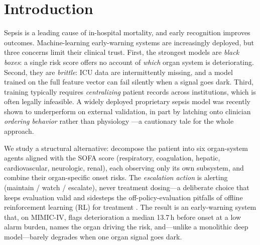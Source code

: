\documentclass[conference]{IEEEtran}
\begin{document}
\section{Introduction}
Sepsis is a leading cause of in-hospital mortality, and early recognition improves
outcomes. Machine-learning early-warning systems are increasingly deployed, but
three concerns limit their clinical trust. First, the strongest models are
\emph{black boxes}: a single risk score offers no account of \emph{which} organ
system is deteriorating. Second, they are \emph{brittle}: ICU data are intermittently
missing, and a model trained on the full feature vector can fail silently when a
signal goes dark. Third, training typically requires \emph{centralizing} patient
records across institutions, which is often legally infeasible. A widely deployed
proprietary sepsis model was recently shown to underperform on external validation,
in part by latching onto clinician \emph{ordering behavior} rather than physiology
\cite{wong2021epic}---a cautionary tale for the whole approach.

We study a structural alternative: decompose the patient into six organ-system
agents aligned with the SOFA score \cite{vincent1996sofa}
(respiratory, coagulation, hepatic, cardiovascular, neurologic, renal), each
observing only its own subsystem, and combine their organ-specific onset risks. The
\emph{escalation action} is alerting (maintain / watch / escalate), never treatment
dosing---a deliberate choice that keeps evaluation valid and sidesteps the
off-policy-evaluation pitfalls of offline reinforcement learning (RL) for treatment
\cite{gottesman2019guidelines,komorowski2018aiclinician}. The result is an
early-warning system that, on MIMIC-IV, flags deterioration a median 13.7\,h before
onset at a low alarm burden, names the organ driving the risk, and---unlike a
monolithic deep model---barely degrades when one organ signal goes dark.
\end{document}
